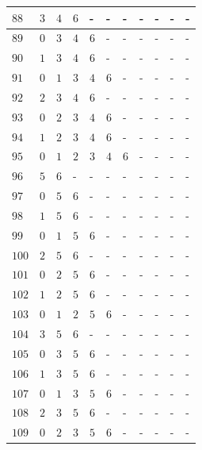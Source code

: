 \begin{appendices}
\begin{table}[H]
\begin{tabular} {|l|l|l|l|l|l|l|l|l|l|l|}
  		$ 88 $ & $ 3 $ &$ 4 $ &$ 6 $ & - &  - &  - &  - &  - &  - &  -   \\ \hline
  		$ 89 $ & $ 0 $ &$ 3 $ &$ 4 $ &$ 6 $ & - &  - &  - &  - &  - &  -   \\ \hline
  		$ 90 $ & $ 1 $ &$ 3 $ &$ 4 $ &$ 6 $ & - &  - &  - &  - &  - &  -   \\ \hline
  		$ 91 $ & $ 0 $ &$ 1 $ &$ 3 $ &$ 4 $ &$ 6 $ & - &  - &  - &  - &  -   \\ \hline
  		$ 92 $ & $ 2 $ &$ 3 $ &$ 4 $ &$ 6 $ & - &  - &  - &  - &  - &  -   \\ \hline
  		$ 93 $ & $ 0 $ &$ 2 $ &$ 3 $ &$ 4 $ &$ 6 $ & - &  - &  - &  - &  -   \\ \hline
  		$ 94 $ & $ 1 $ &$ 2 $ &$ 3 $ &$ 4 $ &$ 6 $ & - &  - &  - &  - &  -   \\ \hline
  		$ 95 $ & $ 0 $ &$ 1 $ &$ 2 $ &$ 3 $ &$ 4 $ &$ 6 $ & - &  - &  - &  -   \\ \hline
  		$ 96 $ & $ 5 $ &$ 6 $ & - &  - &  - &  - &  - &  - &  - &  -   \\ \hline
  		$ 97 $ & $ 0 $ &$ 5 $ &$ 6 $ & - &  - &  - &  - &  - &  - &  -   \\ \hline
  		$ 98 $ & $ 1 $ &$ 5 $ &$ 6 $ & - &  - &  - &  - &  - &  - &  -   \\ \hline
  		$ 99 $ & $ 0 $ &$ 1 $ &$ 5 $ &$ 6 $ & - &  - &  - &  - &  - &  -   \\ \hline
  		$ 100 $ & $ 2 $ &$ 5 $ &$ 6 $ & - &  - &  - &  - &  - &  - &  -   \\ \hline
  		$ 101 $ & $ 0 $ &$ 2 $ &$ 5 $ &$ 6 $ & - &  - &  - &  - &  - &  -   \\ \hline
  		$ 102 $ & $ 1 $ &$ 2 $ &$ 5 $ &$ 6 $ & - &  - &  - &  - &  - &  -   \\ \hline
  		$ 103 $ & $ 0 $ &$ 1 $ &$ 2 $ &$ 5 $ &$ 6 $ & - &  - &  - &  - &  -   \\ \hline
  		$ 104 $ & $ 3 $ &$ 5 $ &$ 6 $ & - &  - &  - &  - &  - &  - &  -   \\ \hline
  		$ 105 $ & $ 0 $ &$ 3 $ &$ 5 $ &$ 6 $ & - &  - &  - &  - &  - &  -   \\ \hline
  		$ 106 $ & $ 1 $ &$ 3 $ &$ 5 $ &$ 6 $ & - &  - &  - &  - &  - &  -   \\ \hline
  		$ 107 $ & $ 0 $ &$ 1 $ &$ 3 $ &$ 5 $ &$ 6 $ & - &  - &  - &  - &  -   \\ \hline
  		$ 108 $ & $ 2 $ &$ 3 $ &$ 5 $ &$ 6 $ & - &  - &  - &  - &  - &  -   \\ \hline
  		$ 109 $ & $ 0 $ &$ 2 $ &$ 3 $ &$ 5 $ &$ 6 $ & - &  - &  - &  - &  -   \\ \hline

\end{tabular}
\end{table}
\end{appendices}
